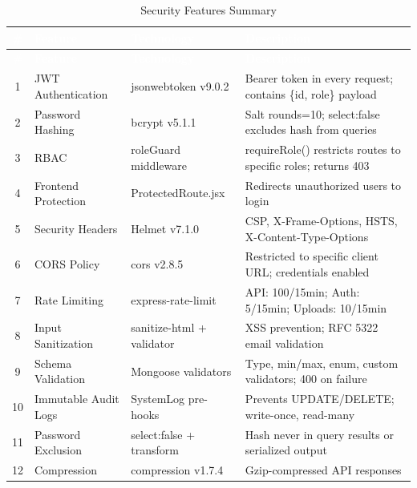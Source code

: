 \documentclass[12pt,a4paper,oneside]{report}
\begin{document}
\begin{longtable}{|c|p{3.2cm}|p{3cm}|p{5.5cm}|}
\caption{Security Features Summary}
\label{tab:security} \\
\hline
\rowcolor{tableHeader}
\textcolor{white}{\#} & \textcolor{white}{\textbf{Feature}} & \textcolor{white}{\textbf{Technology}} & \textcolor{white}{\textbf{Description}} \\
\hline
\endfirsthead
\hline
\rowcolor{tableHeader}
\textcolor{white}{\#} & \textcolor{white}{\textbf{Feature}} & \textcolor{white}{\textbf{Technology}} & \textcolor{white}{\textbf{Description}} \\
\hline
\endhead
1  & JWT Authentication     & jsonwebtoken v9.0.2   & Bearer token in every request; contains \{id, role\} payload \\
\hline\rowcolor{tableRow}
2  & Password Hashing       & bcrypt v5.1.1         & Salt rounds=10; select:false excludes hash from queries \\
\hline
3  & RBAC                   & roleGuard middleware   & requireRole() restricts routes to specific roles; returns 403 \\
\hline\rowcolor{tableRow}
4  & Frontend Protection    & ProtectedRoute.jsx    & Redirects unauthorized users to login \\
\hline
5  & Security Headers       & Helmet v7.1.0         & CSP, X-Frame-Options, HSTS, X-Content-Type-Options \\
\hline\rowcolor{tableRow}
6  & CORS Policy            & cors v2.8.5           & Restricted to specific client URL; credentials enabled \\
\hline
7  & Rate Limiting          & express-rate-limit    & API: 100/15min; Auth: 5/15min; Uploads: 10/15min \\
\hline\rowcolor{tableRow}
8  & Input Sanitization     & sanitize-html + validator & XSS prevention; RFC 5322 email validation \\
\hline
9  & Schema Validation      & Mongoose validators   & Type, min/max, enum, custom validators; 400 on failure \\
\hline\rowcolor{tableRow}
10 & Immutable Audit Logs   & SystemLog pre-hooks   & Prevents UPDATE/DELETE; write-once, read-many \\
\hline
11 & Password Exclusion     & select:false + transform & Hash never in query results or serialized output \\
\hline\rowcolor{tableRow}
12 & Compression            & compression v1.7.4    & Gzip-compressed API responses \\

\end{longtable}
\end{document}
